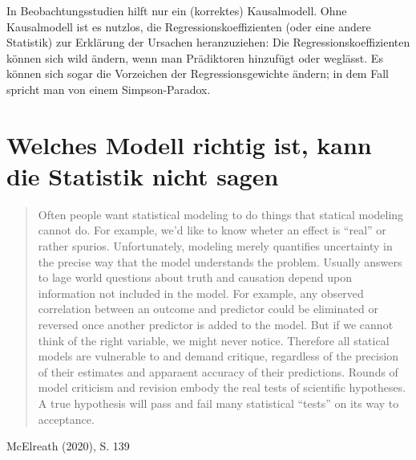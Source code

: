 \documentclass[
  a4paper,
  DIV=11]{scrreprt}
\theoremstyle{definition}
\theoremstyle{remark}
\begin{document}
\begin{tcolorbox}[enhanced jigsaw, leftrule=.75mm, left=2mm, bottomrule=.15mm, opacityback=0, coltitle=black, colbacktitle=quarto-callout-important-color!10!white, opacitybacktitle=0.6, rightrule=.15mm, toptitle=1mm, colback=white, colframe=quarto-callout-important-color-frame, arc=.35mm, toprule=.15mm, breakable, titlerule=0mm, bottomtitle=1mm, title=\textcolor{quarto-callout-important-color}{\faExclamation}\hspace{0.5em}{Wichtig}]
In Beobachtungsstudien hilft nur ein (korrektes) Kausalmodell. Ohne
Kausalmodell ist es nutzlos, die Regressionskoeffizienten (oder eine
andere Statistik) zur Erklärung der Ursachen heranzuziehen: Die
Regressionskoeffizienten können sich wild ändern, wenn man Prädiktoren
hinzufügt oder weglässt. Es können sich sogar die Vorzeichen der
Regressionsgewichte ändern; in dem Fall spricht man von einem
Simpson-Paradox.
\end{tcolorbox}

\hypertarget{welches-modell-richtig-ist-kann-die-statistik-nicht-sagen}{%
\section{Welches Modell richtig ist, kann die Statistik nicht
sagen}\label{welches-modell-richtig-ist-kann-die-statistik-nicht-sagen}}

\begin{quote}
Often people want statistical modeling to do things that statical
modeling cannot do. For example, we'd like to know wheter an effect is
``real'' or rather spurios. Unfortunately, modeling merely quantifies
uncertainty in the precise way that the model understands the problem.
Usually answers to lage world questions about truth and causation depend
upon information not included in the model. For example, any observed
correlation between an outcome and predictor could be eliminated or
reversed once another predictor is added to the model. But if we cannot
think of the right variable, we might never notice. Therefore all
statical models are vulnerable to and demand critique, regardless of the
precision of their estimates and apparaent accuracy of their
predictions. Rounds of model criticism and revision embody the real
tests of scientific hypotheses. A true hypothesis will pass and fail
many statistical ``tests'' on its way to acceptance.
\end{quote}

McElreath (2020), S. 139
\end{document}
